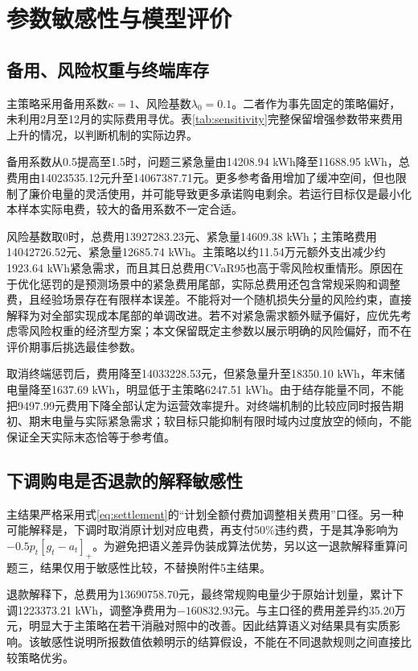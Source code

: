 \section{参数敏感性与模型评价}

\subsection{备用、风险权重与终端库存}

主策略采用备用系数$\kappa=1$、风险基数$\lambda_0=0.1$。二者作为事先固定的策略偏好，未利用2月至12月的实际费用寻优。表\ref{tab:sensitivity}完整保留增强参数带来费用上升的情况，以判断机制的实际边界。

备用系数从0.5提高至1.5时，问题三紧急量由14208.94 kWh降至11688.95 kWh，总费用由14023535.12元升至14067387.71元。更多参考备用增加了缓冲空间，但也限制了廉价电量的灵活使用，并可能导致更多承诺购电剩余。若运行目标仅是最小化本样本实际电费，较大的备用系数不一定合适。

风险基数取0时，总费用13927283.23元、紧急量14609.38 kWh；主策略费用14042726.52元、紧急量12685.74 kWh。主策略以约11.54万元额外支出减少约1923.64 kWh紧急需求，而且其日总费用CVaR95也高于零风险权重情形。原因在于优化惩罚的是预测场景中的紧急费用尾部，实际总费用还包含常规采购和调整费，且经验场景存在有限样本误差。不能将对一个随机损失分量的风险约束，直接解释为对全部实现成本尾部的单调改进。若不对紧急需求额外赋予偏好，应优先考虑零风险权重的经济型方案；本文保留既定主参数以展示明确的风险偏好，而不在评价期事后挑选最佳参数。



取消终端惩罚后，费用降至14033228.53元，但紧急量升至18350.10 kWh，年末储电量降至1637.69 kWh，明显低于主策略6247.51 kWh。由于结存能量不同，不能把9497.99元费用下降全部认定为运营效率提升。对终端机制的比较应同时报告期初、期末电量与实际紧急需求；软目标只能抑制有限时域内过度放空的倾向，不能保证全天实际末态恰等于参考值。

\subsection{下调购电是否退款的解释敏感性}

主结果严格采用式\eqref{eq:settlement}的“计划全额付费加调整相关费用”口径。另一种可能解释是，下调时取消原计划对应电费，再支付50\%违约费，于是其净影响为$-0.5p_t[g_t-a_t]_+$。为避免把语义差异伪装成算法优势，另以这一退款解释重算问题三，结果仅用于敏感性比较，不替换附件5主结果。

退款解释下，总费用为13690758.70元，最终常规购电量少于原始计划量，累计下调1223373.21 kWh，调整净费用为$-160832.93$元。与主口径的费用差异约35.20万元，明显大于主策略在若干消融对照中的改善。因此结算语义对结果具有实质影响。该敏感性说明所报数值依赖明示的结算假设，不能在不同退款规则之间直接比较策略优劣。


